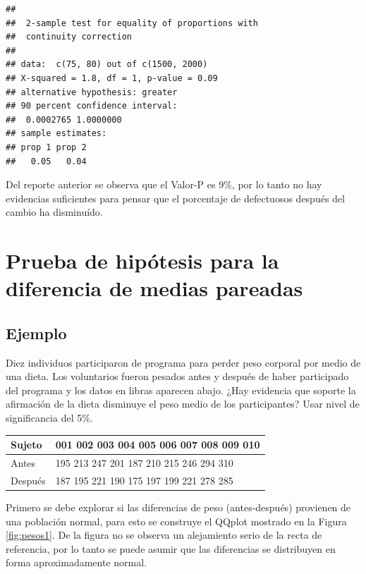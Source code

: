\documentclass[10pt,]{krantz}
\begin{document}
\begin{verbatim}
## 
##  2-sample test for equality of proportions with
##  continuity correction
## 
## data:  c(75, 80) out of c(1500, 2000)
## X-squared = 1.8, df = 1, p-value = 0.09
## alternative hypothesis: greater
## 90 percent confidence interval:
##  0.0002765 1.0000000
## sample estimates:
## prop 1 prop 2 
##   0.05   0.04
\end{verbatim}

Del reporte anterior se observa que el Valor-P es 9\%, por lo tanto no
hay evidencias suficientes para pensar que el porcentaje de defectuosos
después del cambio ha disminuído.

\section{Prueba de hipótesis para la diferencia de medias
pareadas}\label{prueba-de-hipotesis-para-la-diferencia-de-medias-pareadas}

\subsection*{Ejemplo}\label{ejemplo-74}


Diez individuos participaron de programa para perder peso corporal por
medio de una dieta. Los voluntarios fueron pesados antes y después de
haber participado del programa y los datos en libras aparecen abajo.
¿Hay evidencia que soporte la afirmación de la dieta disminuye el peso
medio de los participantes? Usar nivel de significancia del 5\%.

\begin{longtable}[]{@{}ll@{}}
\toprule
Sujeto & 001 002 003 004 005 006 007 008 009 010\tabularnewline
\midrule
\endhead
Antes & 195 213 247 201 187 210 215 246 294 310\tabularnewline
Después & 187 195 221 190 175 197 199 221 278 285\tabularnewline
\bottomrule
\end{longtable}

Primero se debe explorar si las diferencias de peso (antes-después)
provienen de una población normal, para esto se construye el QQplot
mostrado en la Figura \ref{fig:pesos1}. De la figura no se observa un
alejamiento serio de la recta de referencia, por lo tanto se puede
asumir que las diferencias se distribuyen en forma aproximadamente
normal.
\end{document}
